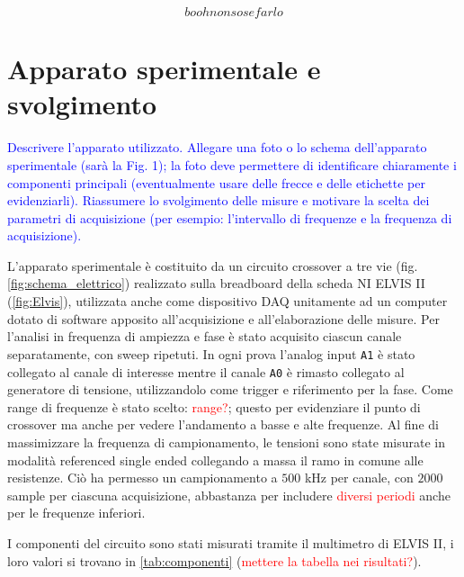 \documentclass[12pt,italian]{article}
\newcommand{\prof}[1]{\textcolor{blue}{#1}}
\newcommand{\err}[1]{\textcolor{red}{#1}}
\begin{document}
\begin{equation}
	booh non so se farlo
\end{equation}

\section*{Apparato sperimentale e svolgimento}
\prof{ Descrivere l'apparato utilizzato. Allegare una foto o lo schema
	dell'apparato sperimentale (sarà la Fig. 1); la foto deve permettere di
	identificare chiaramente i componenti principali (eventualmente usare delle
	frecce e delle etichette per evidenziarli). Riassumere lo svolgimento delle
	misure e motivare la scelta dei parametri di acquisizione (per esempio:
	l'intervallo di frequenze e la frequenza di acquisizione). }

L'apparato sperimentale è costituito da un circuito crossover a tre vie (fig.
\ref{fig:schema_elettrico}) realizzato sulla breadboard della scheda NI ELVIS
II (\cref{fig:Elvis}), utilizzata anche come dispositivo DAQ unitamente ad un
computer dotato di software apposito all'acquisizione e all'elaborazione delle
misure. Per l'analisi in frequenza di ampiezza e fase è stato acquisito ciascun
canale separatamente, con sweep ripetuti. In ogni prova l'analog input
\texttt{A1} è stato collegato al canale di interesse mentre il canale
\texttt{A0} è rimasto collegato al generatore di tensione, utilizzandolo come
trigger e riferimento per la fase. Come range di frequenze è stato scelto:
\err{range?}; questo per evidenziare il punto di crossover ma anche per vedere
l'andamento a basse e alte frequenze. Al fine di massimizzare la frequenza di
campionamento, le tensioni sono state misurate in modalità referenced single
ended collegando a massa il ramo in comune alle resistenze. Ciò ha permesso un
campionamento a $500$ kHz per canale, con $2000$ sample per ciascuna
acquisizione, abbastanza per includere \err{diversi periodi} anche per le
frequenze inferiori.

I componenti del circuito sono stati misurati tramite il multimetro di ELVIS
II, i loro valori si trovano in \cref{tab:componenti} (\err{mettere la tabella
	nei risultati?}).
\end{document}
